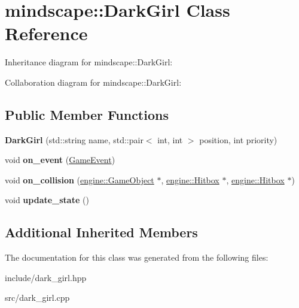 \hypertarget{classmindscape_1_1_dark_girl}{}\section{mindscape\+:\+:Dark\+Girl Class Reference}
\label{classmindscape_1_1_dark_girl}


Inheritance diagram for mindscape\+:\+:Dark\+Girl\+:


Collaboration diagram for mindscape\+:\+:Dark\+Girl\+:
\subsection*{Public Member Functions}
\begin{DoxyCompactItemize}
\item 
{\bfseries Dark\+Girl} (std\+::string name, std\+::pair$<$ int, int $>$ position, int priority)\hypertarget{classmindscape_1_1_dark_girl_a8706a5025f46ae898987f25f775917b3}{}\label{classmindscape_1_1_dark_girl_a8706a5025f46ae898987f25f775917b3}

\item 
void {\bfseries on\+\_\+event} (\hyperlink{class_game_event}{Game\+Event})\hypertarget{classmindscape_1_1_dark_girl_ae9c166c0c5eb205a7e47ce5244d37ab0}{}\label{classmindscape_1_1_dark_girl_ae9c166c0c5eb205a7e47ce5244d37ab0}

\item 
void {\bfseries on\+\_\+collision} (\hyperlink{classengine_1_1_game_object}{engine\+::\+Game\+Object} $\ast$, \hyperlink{classengine_1_1_hitbox}{engine\+::\+Hitbox} $\ast$, \hyperlink{classengine_1_1_hitbox}{engine\+::\+Hitbox} $\ast$)\hypertarget{classmindscape_1_1_dark_girl_a594b92edd6c401bb890ef5972fe15390}{}\label{classmindscape_1_1_dark_girl_a594b92edd6c401bb890ef5972fe15390}

\item 
void {\bfseries update\+\_\+state} ()\hypertarget{classmindscape_1_1_dark_girl_a8575c2baaa6c883f76224b84847d1f2a}{}\label{classmindscape_1_1_dark_girl_a8575c2baaa6c883f76224b84847d1f2a}

\end{DoxyCompactItemize}
\subsection*{Additional Inherited Members}


The documentation for this class was generated from the following files\+:\begin{DoxyCompactItemize}
\item 
include/dark\+\_\+girl.\+hpp\item 
src/dark\+\_\+girl.\+cpp\end{DoxyCompactItemize}
